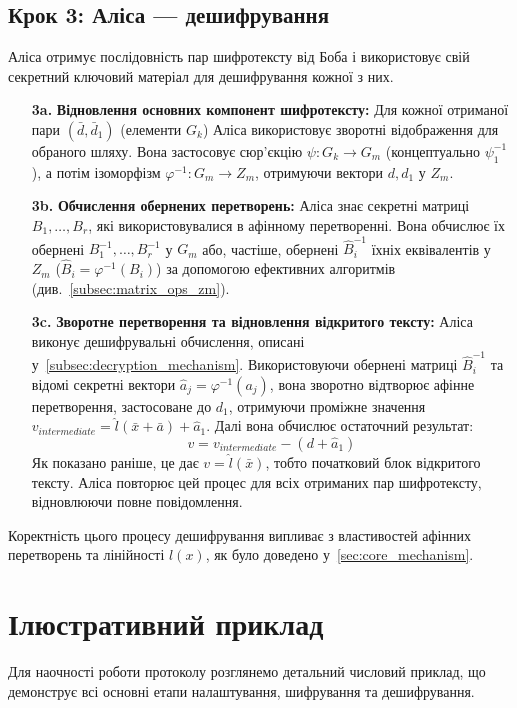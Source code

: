 \subsection{Крок 3: Аліса — дешифрування}
\label{subsec:protocol_step3_alice}
Аліса отримує послідовність пар шифротексту від Боба і використовує свій секретний ключовий матеріал для дешифрування кожної з них.
\begin{enumerate}
    \item[\textbf{3a.}] \textbf{Відновлення основних компонент шифротексту:} Для кожної отриманої пари $(\bar{d}, \bar{d}_1)$ (елементи $G_k$) Аліса використовує зворотні відображення для обраного шляху.
    Вона застосовує сюр'єкцію $\psi: G_k \to G_m$ (концептуально $\psi_1^{-1}$), а потім ізоморфізм $\varphi^{-1}: G_m \to Z_m$, отримуючи вектори $d, d_1$ у $Z_m$.
    \item[\textbf{3b.}] \textbf{Обчислення обернених перетворень:} Аліса знає секретні матриці $B_1, \ldots, B_r$, які використовувалися в афінному перетворенні.
    Вона обчислює їх обернені $B_1^{-1}, \ldots, B_r^{-1}$ у $G_m$ або, частіше, обернені $\hat{B}_i^{-1}$ їхніх еквівалентів у $Z_m$ ($\hat{B}_i = \varphi^{-1}(B_i)$) за допомогою ефективних алгоритмів (див.~\ref{subsec:matrix_ops_zm}).
    \item[\textbf{3c.}] \textbf{Зворотне перетворення та відновлення відкритого тексту:} Аліса виконує дешифрувальні обчислення, описані у~\ref{subsec:decryption_mechanism}.
    Використовуючи обернені матриці $\hat{B}_i^{-1}$ та відомі секретні вектори $\hat{a}_j = \varphi^{-1}(a_j)$, вона зворотно відтворює афінне перетворення, застосоване до $d_1$, отримуючи проміжне значення $v_{intermediate} = \hat{l}(\bar{x} + \bar{a}) + \hat{a}_1$.
    Далі вона обчислює остаточний результат:
    \[
        v = v_{intermediate} - (d + \hat{a}_1)
    \]
    Як показано раніше, це дає $v = \hat{l}(\bar{x})$, тобто початковий блок відкритого тексту.
    Аліса повторює цей процес для всіх отриманих пар шифротексту, відновлюючи повне повідомлення.
\end{enumerate}
Коректність цього процесу дешифрування випливає з властивостей афінних перетворень та лінійності $l(x)$, як було доведено у~\ref{sec:core_mechanism}.


\section{Ілюстративний приклад}
\label{sec:protocol_example}
Для наочності роботи протоколу розглянемо детальний числовий приклад, що демонструє всі основні етапи налаштування, шифрування та дешифрування.

